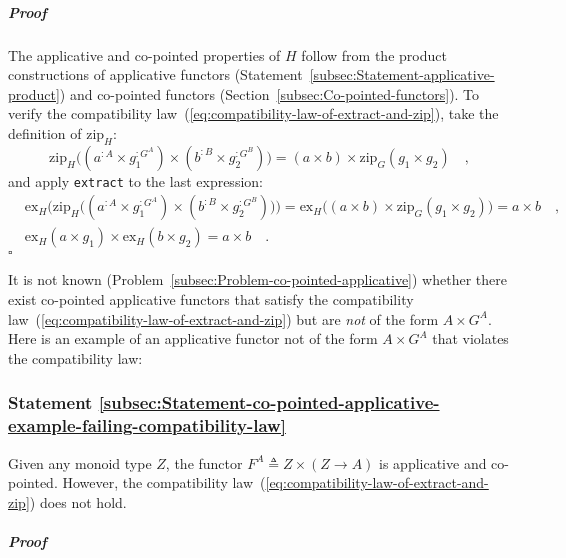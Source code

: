 \subparagraph{Proof}

The applicative and co-pointed properties of $H$ follow from the
product constructions of applicative functors (Statement~\ref{subsec:Statement-applicative-product})
and co-pointed functors (Section~\ref{subsec:Co-pointed-functors}).
To verify the compatibility law~(\ref{eq:compatibility-law-of-extract-and-zip}),
take the definition of $\text{zip}_{H}$: 
\[
\text{zip}_{H}\big((a^{:A}\times g_{1}^{:G^{A}})\times(b^{:B}\times g_{2}^{:G^{B}})\big)=(a\times b)\times\text{zip}_{G}(g_{1}\times g_{2})\quad,
\]
and apply \lstinline!extract! to the last expression:
\begin{align*}
 & \text{ex}_{H}\big(\text{zip}_{H}\big((a^{:A}\times g_{1}^{:G^{A}})\times(b^{:B}\times g_{2}^{:G^{B}})\big)\big)=\text{ex}_{H}\big((a\times b)\times\text{zip}_{G}(g_{1}\times g_{2})\big)=a\times b\quad,\\
 & \text{ex}_{H}(a\times g_{1})\times\text{ex}_{H}(b\times g_{2})=a\times b\quad.
\end{align*}
$\square$

It is not known (Problem~\ref{subsec:Problem-co-pointed-applicative})
whether there exist co-pointed applicative functors that satisfy the
compatibility law~(\ref{eq:compatibility-law-of-extract-and-zip})
but are \emph{not} of the form $A\times G^{A}$. Here is an example
of an applicative functor not of the form $A\times G^{A}$ that violates
the compatibility law:

\subsubsection{Statement \label{subsec:Statement-co-pointed-applicative-example-failing-compatibility-law}\ref{subsec:Statement-co-pointed-applicative-example-failing-compatibility-law}}

Given any monoid type $Z$, the functor $F^{A}\triangleq Z\times\left(Z\rightarrow A\right)$
is applicative and co-pointed. However, the compatibility law~(\ref{eq:compatibility-law-of-extract-and-zip})
does not hold. 

\subparagraph{Proof}

